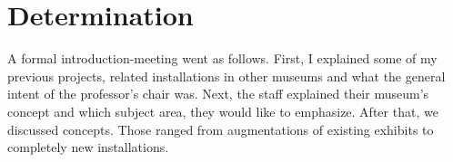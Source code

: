 
%


\section{Determination}
\label{partnering_determination}

A formal introduction-meeting went as follows. First, I explained some of my previous projects, related installations in other museums and what the general intent of the professor's chair was. Next, the staff explained their museum's concept and which subject area, they would like to emphasize. After that, we discussed concepts. Those ranged from augmentations of existing exhibits to completely new installations.

